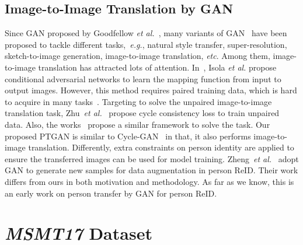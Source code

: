 \documentclass[10pt,twocolumn,letterpaper]{article}
\begin{document}
\subsection{Image-to-Image Translation by GAN}
Since GAN proposed by Goodfellow \emph{et al.}~\cite{goodfellow2014generative}, many variants of GAN~\cite{mirza2014conditional,reed2016generative,wang2016generative,yoo2016pixel,li2016precomputed,yan2016attribute2image,ledig2016photo,gatys2016image,liu2016coupled,yi2017dualgan,kim2017learning,zhu2017unpaired} have been proposed to tackle different tasks,~\emph{e.g.}, natural style transfer, super-resolution, sketch-to-image generation, image-to-image translation, \emph{etc}. Among them, image-to-image translation has attracted lots of attention. In~\cite{isola2016image}, Isola \emph{et al.} propose conditional adversarial networks to learn the mapping function from input to output images. However, this method requires paired training data, which is hard to acquire in many tasks~\cite{zhu2017unpaired}. Targeting to solve the unpaired image-to-image translation task, Zhu~\emph{et al.}~\cite{zhu2017unpaired} propose cycle consistency loss to train unpaired data. Also, the works~\cite{yi2017dualgan,kim2017learning} propose a similar framework to solve the task. Our proposed PTGAN is similar to Cycle-GAN~\cite{zhu2017unpaired} in that, it also performs image-to-image translation. Differently, extra constraints on person identity are applied to ensure the transferred images can be used for model training. Zheng~\emph{et al.}~\cite{zheng2017unlabeled} adopt GAN to generate new samples for data augmentation in person ReID. Their work differs from ours in both motivation and methodology. As far as we know, this is an early work on person transfer by GAN for person ReID.


\section{\emph{MSMT17} Dataset}
\label{sec:pkudataset}
\end{document}
